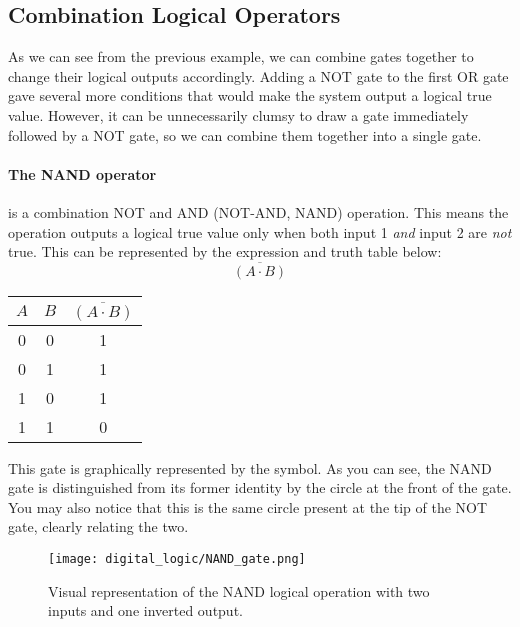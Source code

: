 
    \subsection{Combination Logical Operators}
    As we can see from the previous example, we can combine gates together to change their logical outputs accordingly.
    Adding a NOT gate to the first OR gate gave several more conditions that would make the system output a logical true value.
    However, it can be unnecessarily clumsy to draw a gate immediately followed by a NOT gate, so we can combine them together into a single gate.

    \paragraph*{The NAND operator} is a combination NOT and AND (NOT-AND, NAND) operation. 
    This means the operation outputs a logical true value only when both input 1 \textit{and} input 2 are \textit{not} true.
    This can be represented by the expression and truth table below:
    \begin{equation*}
        \overline{(A \cdot B)}
    \end{equation*}

    \begin{table}[h!]
        \begin{tabular}{c c | c}
            \toprule
            $A$ & $B$ & $\overline{(A \cdot B)}$  \\
            \midrule
             0  &  0  &    1    \\
             0  &  1  &    1    \\
             1  &  0  &    1    \\
             1  &  1  &    0    \\
            \bottomrule
        \end{tabular}
    \end{table}

    This gate is graphically represented by the symbol. 
    As you can see, the NAND gate is distinguished from its former identity by the circle at the front of the gate.
    You may also notice that this is the same circle present at the tip of the NOT gate, clearly relating the two.
    \begin{figure}[h!]
        \texttt{[image: digital\_logic/NAND\_gate.png]}
        \caption[NAND Gate]{Visual representation of the NAND logical operation with two inputs and one inverted output.}
    \end{figure}

